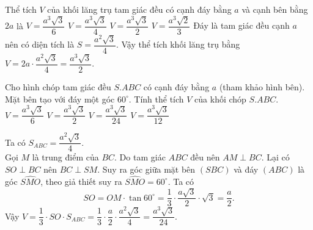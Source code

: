 \begin{ex}%
 Thể tích $V$ của khối lăng trụ tam giác đều có cạnh đáy bằng $a$ và cạnh bên bằng $2a$ là
 \choice
  {$V=\dfrac{a^3\sqrt{3}}{6}$}
  {$V=\dfrac{a^3\sqrt{3}}{4}$}
  {\True $V=\dfrac{a^3\sqrt{3}}{2}$}
  {$V=\dfrac{a^3\sqrt{2}}{3}$}
 \loigiai
  {
  Đáy là tam giác đều cạnh $a$ nên có diện tích là $S=\dfrac{a^2\sqrt{3}}{4}$. Vậy thể tích khối lăng trụ bằng $V=2a\cdot \dfrac{a^2\sqrt{3}}{4}=\dfrac{a^3\sqrt{3}}{2}$.
  }
\end{ex}

\begin{ex}%
 \immini
 {
 Cho hình chóp tam giác đều $S.ABC$ có cạnh đáy bằng $a$ (tham khảo hình bên). Mặt bên tạo với đáy một góc $60^\circ$. Tính thể tích $V$ của khối chóp $S.ABC$.
 \choice
  {$V=\dfrac{a^3\sqrt{3}}{6}$}
  {$V=\dfrac{a^3\sqrt{3}}{2}$}
  {\True $V=\dfrac{a^3\sqrt{3}}{24}$}
  {$V=\dfrac{a^3\sqrt{3}}{12}$}
 }
 {
 }
 \loigiai
  {
  \immini
  {
  Ta có $S_{ABC}=\dfrac{a^2\sqrt{3}}{4}$.\\
  Gọi $M$ là trung điểm của $BC$. Do tam giác $ABC$ đều nên $AM\perp BC$. Lại có $SO\perp BC$ nên $BC\perp SM$. Suy ra góc giữa mặt bên $(SBC)$ và đáy $(ABC)$ là góc $\widehat{SMO}$, theo giả thiết suy ra $\widehat{SMO}=60^\circ$. Ta có
  \[SO=OM\cdot \tan 60^\circ=\dfrac{1}{3}\cdot\dfrac{a\sqrt{3}}{2}\cdot \sqrt{3}=\dfrac{a}{2}.\]
  Vậy $V=\dfrac{1}{3}\cdot SO\cdot S_{ABC}=\dfrac{1}{3}\cdot\dfrac{a}{2}\cdot\dfrac{a^2\sqrt{3}}{4}=\dfrac{a^3\sqrt{3}}{24}$.
  }
  {
  }
  }
\end{ex}

